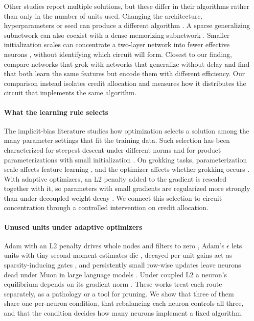 \documentclass{article} %
\begin{document}
Other studies report multiple solutions, but these differ in their algorithms rather than only in the number of units used. Changing the architecture, hyperparameters or seed can produce a different algorithm \citep{zhong2023clock}. A sparse generalizing subnetwork can also coexist with a dense memorizing subnetwork \citep{merrill2023tale}. Smaller initialization scales can concentrate a two-layer network into fewer effective neurons \citep{luo2021phase}, without identifying which circuit will form. Closest to our finding, \citet{manningcoe2025grokking} compare networks that grok with networks that generalize without delay and find that both learn the same features but encode them with different efficiency. Our comparison instead isolates credit allocation and measures how it distributes the circuit that implements the same algorithm.

\paragraph{What the learning rule selects}
The implicit-bias literature studies how optimization selects a solution among the many parameter settings that fit the training data. Such selection has been characterized for steepest descent under different norms \citep{gunasekar2018implicit} and for product parameterizations with small initialization \citep{woodworth2020kernel}. On grokking tasks, parameterization scale affects feature learning \citep{kumar2024grokking}, and the optimizer affects whether grokking occurs \citep{thilak2022slingshot}. With adaptive optimizers, an L2 penalty added to the gradient is rescaled together with it, so parameters with small gradients are regularized more strongly than under decoupled weight decay \citep{loshchilov2019decoupled}. We connect this selection to circuit concentration through a controlled intervention on credit allocation.

\paragraph{Unused units under adaptive optimizers}
Adam with an L2 penalty drives whole nodes and filters to zero \citep{yaguchi2018adam,mehta2019implicit}, Adam's $\epsilon$ lets units with tiny second-moment estimates die \citep{dufortlabbe2025maxwell}, decayed per-unit gains act as sparsity-inducing gates \citep{mehta2019implicit,kolb2025dgating}, and persistently small row-wise updates leave neurons dead under Muon in large language models \citep{dewulf2026aurora}. Under coupled L2 a neuron's equilibrium depends on its gradient norm \citep{kosson2024rotational}. These works treat each route separately, as a pathology or a tool for pruning. We show that three of them share one per-neuron condition, that rebalancing each neuron controls all three, and that the condition decides how many neurons implement a fixed algorithm.
\end{document}
